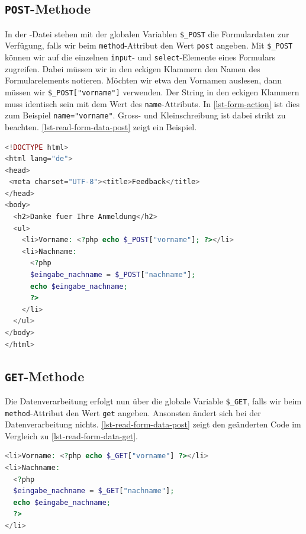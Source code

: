\subsection{\texttt{POST}-Methode}

In der -Datei stehen mit der globalen Variablen \lstinline{$_POST} die Formulardaten zur Verfügung, falls wir beim \lstinline{method}-Attribut den Wert \lstinline{post} angeben. Mit \lstinline{$_POST} können wir auf die einzelnen \lstinline{input}- und \lstinline{select}-Elemente eines Formulars zugreifen. Dabei müssen wir in den eckigen Klammern den Namen des Formularelements notieren. Möchten wir etwa den Vornamen auslesen, dann müssen wir \lstinline{$_POST["vorname"]} verwenden. Der String in den eckigen Klammern muss identisch sein mit dem Wert des \lstinline{name}-Attributs. In \autoref{lst-form-action} ist dies zum Beispiel \lstinline{name="vorname"}. Gross- und Kleinschreibung ist dabei strikt zu beachten. \autoref{lst-read-form-data-post} zeigt ein Beispiel.

\begin{lstlisting}[language=PHP, alsolanguage=HTML, caption={Daten können direkt ausgeben oder zuvor in einer Variablen gespeichert werden.}, label={lst-read-form-data-post}]
<!DOCTYPE html>
<html lang="de">
<head>
 <meta charset="UTF-8"><title>Feedback</title>
</head>
<body>
  <h2>Danke fuer Ihre Anmeldung</h2>
  <ul>
    <li>Vorname: <?php echo $_POST["vorname"]; ?></li>
    <li>Nachname: 
      <?php 
      $eingabe_nachname = $_POST["nachname"]; 
      echo $eingabe_nachname; 
      ?>
    </li>
  </ul>
</body>
</html>
\end{lstlisting}

\subsection{\texttt{GET}-Methode}

Die Datenverarbeitung erfolgt nun über die globale Variable \lstinline{$_GET}, falls wir beim \lstinline{method}-Attribut den Wert \lstinline{get} angeben. Ansonsten ändert sich bei der Datenverarbeitung nichts. \autoref{lst-read-form-data-post} zeigt den geänderten Code im Vergleich zu \autoref{lst-read-form-data-get}.

\begin{lstlisting}[language=PHP, alsolanguage=HTML, caption={Die globale Variable \lstinline{$_GET} muss bei \lstinline{method="get"} benutzt werden.}, label={lst-read-form-data-get}]
<li>Vorname: <?php echo $_GET["vorname"] ?></li>
<li>Nachname: 
  <?php 
  $eingabe_nachname = $_GET["nachname"]; 
  echo $eingabe_nachname; 
  ?>
</li>
\end{lstlisting}